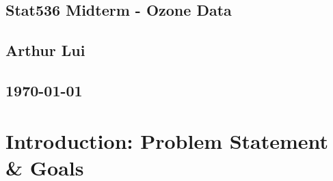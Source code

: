 \documentclass{article}                                                   %
\begin{document}
\begin{center}                                                            %
  \section*{\textbf{Stat536 Midterm - Ozone Data}}                        %
  \subsection*{\textbf{Arthur Lui}}                                       %
  \subsection*{\noindent\today}                                           %
\end{center}                                                              %

\section{Introduction: Problem Statement \& Goals}
\end{document}
